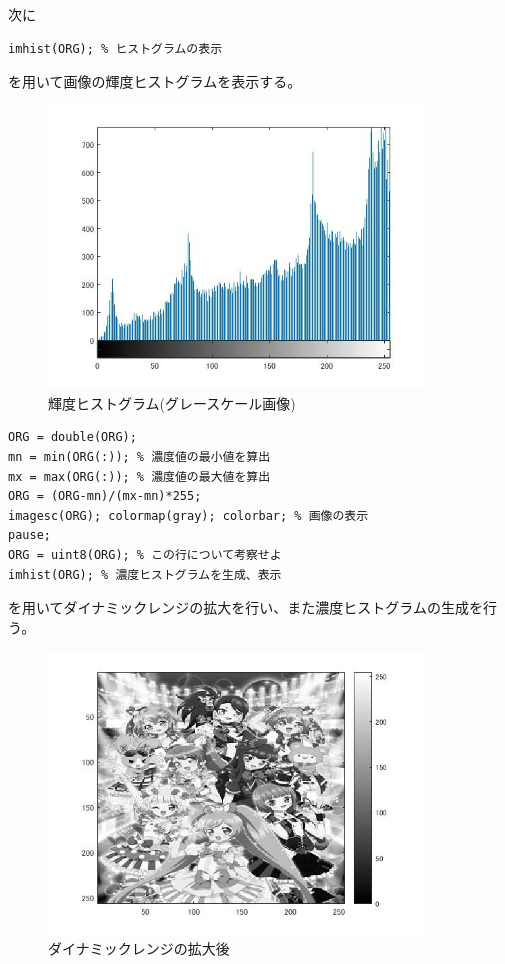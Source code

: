 \documentclass{jsarticle}
\begin{document}
次に
\begin{lstlisting}[basicstyle=\ttfamily\footnotesize, frame=single]
imhist(ORG); % ヒストグラムの表示
 \end{lstlisting}
を用いて画像の輝度ヒストグラムを表示する。

\newpage
\begin{figure}[htbp]
 \begin{center}
  \includegraphics[width=10cm]{kadai7-1.jpg}
 \end{center}
 \caption{輝度ヒストグラム(グレースケール画像)}
\end{figure}

\begin{lstlisting}[basicstyle=\ttfamily\footnotesize, frame=single]
ORG = double(ORG);
mn = min(ORG(:)); % 濃度値の最小値を算出
mx = max(ORG(:)); % 濃度値の最大値を算出
ORG = (ORG-mn)/(mx-mn)*255;
imagesc(ORG); colormap(gray); colorbar; % 画像の表示
pause;
ORG = uint8(ORG); % この行について考察せよ
imhist(ORG); % 濃度ヒストグラムを生成、表示
 \end{lstlisting}
を用いてダイナミックレンジの拡大を行い、また濃度ヒストグラムの生成を行う。
\newpage
\begin{figure}[htbp]
 \begin{center}
  \includegraphics[width=10cm]{kadai7-2.jpg}
 \end{center}
 \caption{ダイナミックレンジの拡大後}
\end{figure}
\end{document}
